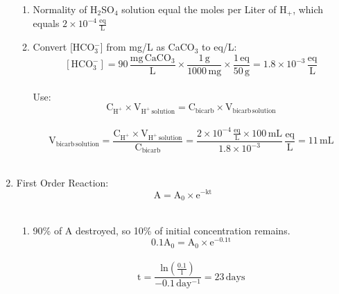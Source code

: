 \documentclass[12pt,letterpaper]{article}
\begin{document}
\begin{enumerate}
\begin{enumerate}
\item Normality of H$_2$SO$_4$ solution equal the moles per Liter of H$_+$, which equals $\mathrm{2\times 10^{-4}\,\frac{eq}{L}}$\\

\item 
Convert [HCO$_3^-$] from mg/L as CaCO$_3$ to eq/L:\\

\begin{equation*}
\mathrm{[HCO_3^-] = 90\, \frac{mg\, CaCO_3}{L}\times \frac{1\,g}{1000\, mg}\times \frac{1\, eq}{50\, g} = 1.8\times 10^{-3}\, \frac{eq}{L}}
\end{equation*}\\

Use:\\

\begin{equation*}
\mathrm{C_{H^+}\times V_{H^+\, solution} = C_{bicarb} \times V_{bicarb\, solution}}
\end{equation*}\\

\begin{equation*}
\mathrm{V_{bicarb\, solution} = \frac{C_{H^+}\times V_{H^+\, solution}}{C_{bicarb}} = \frac{2\times 10^{-4}\, \frac{eq}{L}\times 100\, mL}{1.8\times 10^{-3}}\, \frac{eq}{L} = 11\, mL}
\end{equation*}\\
\end{enumerate}

\item
First Order Reaction:\\

\begin{equation*}
\mathrm{A = A_0\times e^{-kt}}
\end{equation*}\\

\begin{enumerate}

\item 90\% of A destroyed, so 10\% of initial concentration remains.\\

\begin{equation*}
\mathrm{0.1A_0 = A_0\times e^{-0.1t}}
\end{equation*}\\

\begin{equation*}
\mathrm{t = \frac{ln(\frac{0.1}{1})}{-0.1\, day^{-1}}  = 23\, days}
\end{equation*}\\


\end{enumerate}
\end{enumerate}
\end{document}
